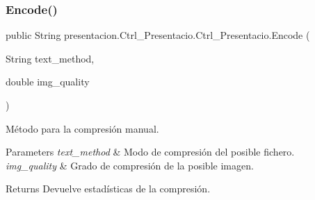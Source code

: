 \subsubsection{\texorpdfstring{Encode()}{Encode()}}
{\footnotesize\ttfamily public String presentacion.\+Ctrl\+\_\+\+Presentacio.\+Ctrl\+\_\+\+Presentacio.\+Encode (\begin{DoxyParamCaption}\item[{String}]{text\+\_\+method,  }\item[{double}]{img\+\_\+quality }\end{DoxyParamCaption})\hspace{0.3cm}{\ttfamily [inline]}}



Método para la compresión manual. 


\begin{DoxyParams}{Parameters}
{\em text\+\_\+method} & Modo de compresión del posible fichero. \\
\hline
{\em img\+\_\+quality} & Grado de compresión de la posible imagen. \\
\hline
\end{DoxyParams}
\begin{DoxyReturn}{Returns}
Devuelve estadísticas de la compresión. 
\end{DoxyReturn}

